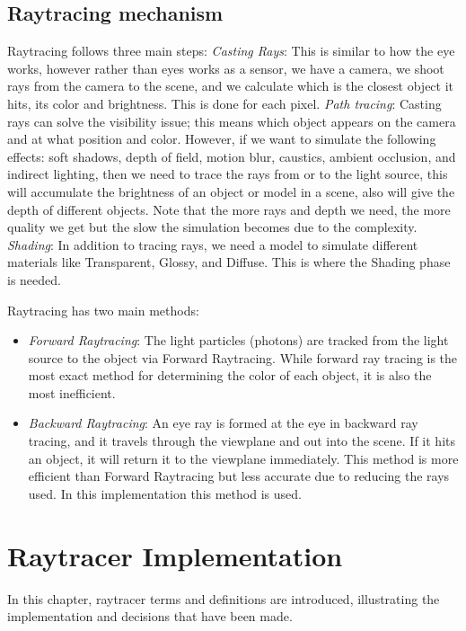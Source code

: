 \documentclass[11pt,a4paper]{article}
\begin{document}
	\subsection{Raytracing mechanism}
	Raytracing follows three main steps: 
	\textit{Casting Rays}: This is similar to how the eye works, however rather than eyes works as a sensor, we have a camera, we shoot rays from the camera to the scene, and we calculate which is the closest object it hits, its color and brightness. This is done for each pixel.
	\textit{Path tracing}: Casting rays can solve the visibility issue; this means which object appears on the camera and at what position and color. However, if we want to simulate the following effects:  soft shadows, depth of field, motion blur, caustics, ambient occlusion, and indirect lighting, then we need to trace the rays from or to the light source, this will accumulate the brightness of an object or model in a scene, also will give the depth of different objects. Note that the more rays and depth we need, the more quality we get but the slow the simulation becomes due to the complexity.
	\textit{Shading}: In addition to tracing rays, we need a model to simulate different materials like Transparent, Glossy, and Diffuse. This is where the Shading phase is needed.
	
	\vspace*{5px}
	Raytracing has two main methods: 
	\begin{itemize}
		\item 		\textit{Forward Raytracing}: The light particles (photons) are tracked from the light source to the object via Forward Raytracing. While forward ray tracing is the most exact method for determining the color of each object, it is also the most inefficient.
		\item 		\textit{Backward Raytracing}: 
		An eye ray is formed at the eye in backward ray tracing, and it travels through the viewplane and out into the scene. If it hits an object, it will return it to the viewplane immediately. This method is more efficient than Forward Raytracing but less accurate due to reducing the rays used. In this implementation this method is used.
	\end{itemize}
	
	\section{Raytracer Implementation}
	In this chapter, raytracer terms and definitions are introduced, illustrating the implementation and decisions that have been made. 
	
\end{document}
